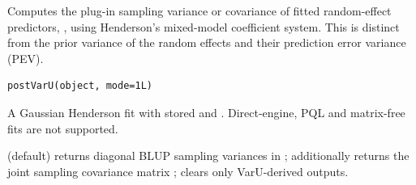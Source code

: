 \documentclass[a4paper]{book}
\begin{document}
%
\begin{Description}\relax
Computes the plug-in sampling variance or covariance of fitted random-effect
predictors, , using Henderson's mixed-model coefficient system.
This is distinct from the prior variance of the random effects and their
prediction error variance (PEV).
\end{Description}
%
\begin{Usage}
\begin{verbatim}
postVarU(object, mode=1L)
\end{verbatim}
\end{Usage}
%
\begin{Arguments}
\begin{ldescription}
\item[\code{object}] A Gaussian  Henderson fit with stored  and
. Direct-engine, PQL and matrix-free  fits are
not supported.
\item[\code{mode}]  (default) returns diagonal BLUP sampling variances in
;  additionally returns the joint sampling covariance
matrix ;  clears only VarU-derived outputs.
\end{ldescription}
\end{Arguments}
%
\end{document}

